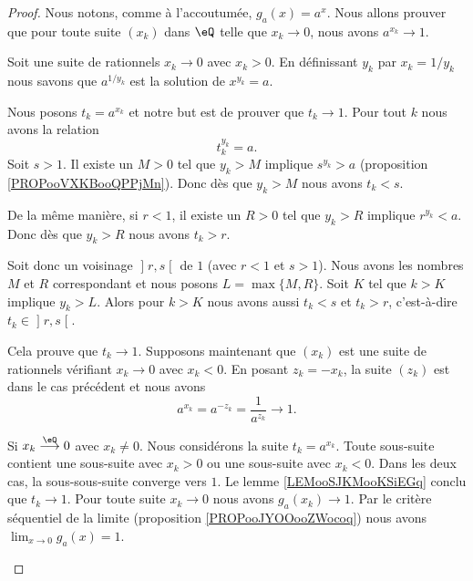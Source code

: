 \begin{proof}
    Nous notons, comme à l'accoutumée, \( g_a(x)=a^x\). Nous allons prouver que pour toute suite \( (x_k)\) dans \( \eQ\) telle que \( x_k\to 0\), nous avons \( a^{x_k}\to 1\).
    \begin{subproof}
    Soit une suite de rationnels \( x_k\to 0\) avec \( x_k>0\). En définissant \( y_k\) par \( x_k=1/y_k\) nous savons que \( a^{1/y_k}\) est la solution de \( x^{y_k}=a\).

	Nous posons \( t_k=a^{x_k}\) et notre but est de prouver que \( t_k\to 1\). Pour tout \( k\) nous avons la relation
	\begin{equation}
		t_k^{y_k}=a.
	\end{equation}
	Soit \( s>1\). Il existe un \( M>0\) tel que \( y_k>M\) implique \( s^{y_k}>a\) (proposition \ref{PROPooVXKBooQPPjMn}). Donc dès que \( y_k>M\) nous avons \( t_k<s\).

	De la même manière, si \( r<1\), il existe un \( R>0\) tel que \( y_k>R\) implique \( r^{y_k}<a\). Donc dès que \( y_k>R\) nous avons \( t_k>r\).

	Soit donc un voisinage \( \mathopen] r , s \mathclose[\) de \( 1\) (avec \( r<1\) et \( s>1\)). Nous avons les nombres \( M\) et \( R\) correspondant et nous posons \( L=\max\{ M,R \}\). Soit \( K\) tel que \( k>K\) implique \( y_k>L\). Alors pour \( k>K\) nous avons aussi \( t_k<s\) et \( t_k>r\), c'est-à-dire \( t_k\in \mathopen] r , s \mathclose[\).

	Cela prouve que \( t_k\to 1\).
    Supposons maintenant que \( (x_k)\) est une suite de rationnels vérifiant \( x_k\to 0\) avec \( x_k<0\). En posant \( z_k=-x_k\), la suite \( (z_k)\) est dans le cas précédent et nous avons
    \begin{equation}
        a^{x_k}=a^{-z_k}=\frac{1}{ a^{z_k} }\to 1.
    \end{equation}

    Si \( x_k\stackrel{\eQ}{\longrightarrow}0\) avec \( x_k\neq 0\). Nous considérons la suite \( t_k=a^{x_k}\). Toute sous-suite contient une sous-suite avec \( x_k>0\) ou une sous-suite avec \( x_k<0\). Dans les deux cas, la sous-sous-suite converge vers \( 1\). Le lemme \ref{LEMooSJKMooKSiEGq} conclu que \( t_k\to 1\).
    \spitem[Conclusion]
	Pour toute suite \( x_k\to 0\) nous avons \( g_a(x_k)\to 1\). Par le critère séquentiel de la limite (proposition \ref{PROPooJYOOooZWocoq}) nous avons \( \lim_{x\to 0} g_a(x)=1\).
    \end{subproof}

\end{proof}


